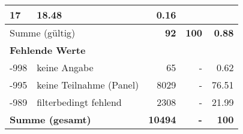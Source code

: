 \begin{longtable}{lXrrr}
       \num{17} &
       \num[round-mode=places,round-precision=2]{18.48} &
         \num[round-mode=places,round-precision=2]{0.16} \\
     \midrule
     \multicolumn{2}{l}{Summe (gültig)} &
       \textbf{\num{92}} &
     \textbf{\num{100}} &
       \textbf{\num[round-mode=places,round-precision=2]{0.88}} \\
     \multicolumn{5}{l}{\textbf{Fehlende Werte}}\\
       -998 &
       keine Angabe &
         \num{65} &
        - &
         \num[round-mode=places,round-precision=2]{0.62} \\
       -995 &
       keine Teilnahme (Panel) &
         \num{8029} &
        - &
         \num[round-mode=places,round-precision=2]{76.51} \\
       -989 &
       filterbedingt fehlend &
         \num{2308} &
        - &
         \num[round-mode=places,round-precision=2]{21.99} \\
     \midrule
     \multicolumn{2}{l}{\textbf{Summe (gesamt)}} &
          \textbf{\num{10494}} &
        \textbf{-} &
        \textbf{\num{100}} \\
     \bottomrule
     \end{longtable}
     
